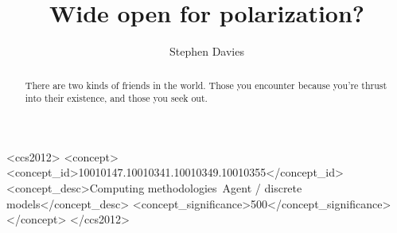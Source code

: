 \documentclass[sigconf]{acmart}
\begin{document}
\title{Wide open for polarization?}


\author{Stephen Davies}

\renewcommand{\shortauthors}{S. Davies}


\begin{abstract}
There are two kinds of friends in the world. Those you encounter because
you're thrust into their existence, and those you seek out.
\end{abstract}

%
%
\begin{CCSXML}
<ccs2012>
<concept>
<concept_id>10010147.10010341.10010349.10010355</concept_id>
<concept_desc>Computing methodologies~Agent / discrete models</concept_desc>
<concept_significance>500</concept_significance>
</concept>
</ccs2012>
\end{CCSXML}





\maketitle




 
\end{document}
